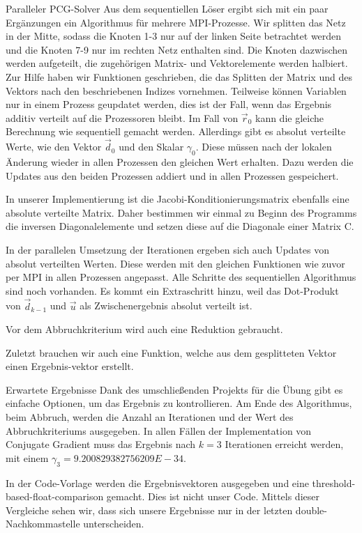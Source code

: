 \documentclass[
ngerman,
subtask=ruled %
]{tudaexercise}
\begin{document}
	\begin{task}{Paralleler PCG-Solver}
		Aus dem sequentiellen Löser ergibt sich mit ein paar Ergänzungen ein Algorithmus für mehrere MPI-Prozesse.
		Wir splitten das Netz in der Mitte, sodass die Knoten 1-3 nur auf der linken Seite betrachtet werden und die Knoten 7-9 nur im rechten Netz enthalten sind. Die Knoten dazwischen werden aufgeteilt, die zugehörigen Matrix- und Vektorelemente werden halbiert.
		Zur Hilfe haben wir Funktionen geschrieben, die das Splitten der Matrix und des Vektors nach den beschriebenen Indizes vornehmen. Teilweise können Variablen nur in einem Prozess geupdatet werden, dies ist der Fall, wenn das Ergebnis additiv verteilt auf die Prozessoren bleibt. Im Fall von $\vec{r}_0$ kann die gleiche Berechnung wie sequentiell gemacht werden.
		Allerdings gibt es absolut verteilte Werte, wie den Vektor $\vec{d}_0$ und den Skalar $\gamma_0$. Diese müssen nach der lokalen Änderung wieder in allen Prozessen den gleichen Wert erhalten. Dazu werden die Updates aus den beiden Prozessen addiert und in allen Prozessen gespeichert.
		
		In unserer Implementierung ist die Jacobi-Konditionierungsmatrix ebenfalls eine absolute verteilte Matrix. Daher bestimmen wir einmal zu Beginn des Programms die inversen Diagonalelemente und setzen diese auf die Diagonale einer Matrix C.
		
		In der parallelen Umsetzung der Iterationen ergeben sich auch Updates von absolut verteilten Werten. Diese werden mit den gleichen Funktionen wie zuvor per MPI in allen Prozessen angepasst. Alle Schritte des sequentiellen Algorithmus sind noch vorhanden. Es kommt ein Extraschritt hinzu, weil das Dot-Produkt von $\vec{d}_{k-1}$ und $\vec{u}$ als Zwischenergebnis absolut verteilt ist.
		
		Vor dem Abbruchkriterium wird auch eine Reduktion gebraucht.
		
		Zuletzt brauchen wir auch eine Funktion, welche aus dem gesplitteten Vektor einen Ergebnis-vektor erstellt.
	\end{task}	

	\begin{task}{Erwartete Ergebnisse}
		Dank des umschließenden Projekts für die Übung gibt es einfache Optionen, um das Ergebnis zu kontrollieren.
		Am Ende des Algorithmus, beim Abbruch, werden die Anzahl an Iterationen und der Wert des Abbruchkriteriums ausgegeben.
		In allen Fällen der Implementation von Conjugate Gradient muss das Ergebnis nach $k = 3$ Iterationen erreicht werden, mit einem $\gamma_3 = 9.200829382756209 E -34$.
		
		In der Code-Vorlage werden die Ergebnisvektoren ausgegeben und eine threshold-based-float-comparison gemacht. Dies ist nicht unser Code. Mittels dieser Vergleiche sehen wir, dass sich unsere Ergebnisse nur in der letzten double-Nachkommastelle unterscheiden.
	\end{task}	
\end{document}
